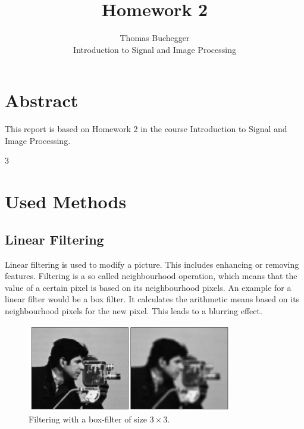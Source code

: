 \documentclass[12pt]{article}
\begin{document}


\title{Homework 2}%
\author{Thomas Buchegger\\ %
Introduction to Signal and Image Processing}
\maketitle

\section*{Abstract}
This report is based on Homework 2 in the course Introduction to Signal and Image Processing. 

\setcounter{tocdepth}3 %
\tableofcontents

\pagebreak
\section{Used Methods}
\subsection{Linear Filtering}
Linear filtering is used to modify a picture. This includes enhancing or removing features. Filtering is a so called neighbourhood operation, which means
that the value of a certain pixel is based on its neighbourhood pixels.
\newline
An example for a linear filter would be a box filter. It calculates the arithmetic means
based on its neighbourhood pixels for the new pixel. This leads to a blurring effect. 

\begin{figure}[!htb]
    \centering
    \includegraphics[width=0.8\textwidth]{pics/boxFilterExample}
    \caption{Filtering with a box-filter of size $3 \times 3$.}
    \label{fig:boxfilter}
    \end{figure}
\end{document}
